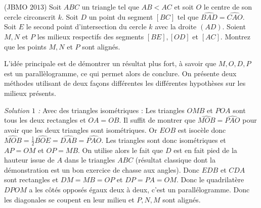 \begin{exo}
(JBMO $2013$)
Soit $ABC$ un triangle tel que $AB<AC$ et soit $O$ le centre de son cercle circonscrit $k$. Soit $D$ un point du segment $[BC]$ tel que $\widehat{BAD}=\widehat{CAO}$. Soit $E$ le second point d'intersection du cercle $k$ avec la droite $(AD)$. Soient $M,N$ et $P$ les milieux respectifs des segments $[BE], [OD]$ et $[AC]$. Montrez que les points $M,N$ et $P$ sont align\'es.
\end{exo}

\begin{sol}
\begin{center}
\end{center}

L'idée principale est de démontrer un résultat plus fort, à savoir que $M,O,D,P$ est un parallèlogramme, ce qui permet alors de conclure. On présente deux méthodes utilisant de deux façons différentes les différentes hypothèses sur les milieux présents.

\textit{Solution $1$ :} Avec des triangles isométriques :
Les triangles $OMB$ et $POA$ sont tous les deux rectangles et $OA=OB$. Il suffit de montrer que $\widehat{MOB}=\widehat{PAO}$ pour avoir que les deux triangles sont isométriques.
Or $EOB$ est isocèle donc $\widehat{MOB}=\frac{1}{2}\widehat{BOE}=\widehat{DAB}=\widehat{PAO}$. Les triangles sont donc isométriques et $AP=OM$ et $OP=MB$.
On utilise alors le fait que $D$ est en fait pied de la hauteur issue de $A$ dans le triangles $ABC$ (résultat classique dont la démonstration est un bon exercice de chasse aux angles). Donc $EDB$ et $CDA$ sont rectangles et $DM=MB=OP$ et $DP=PA=OM$. Donc le quadrilatère $DPOM$ a les côtés opposés égaux deux à deux, c'est un parallélogramme. Donc les diagonales se coupent en leur milieu et $P,N,M$ sont alignés.


\end{sol}
